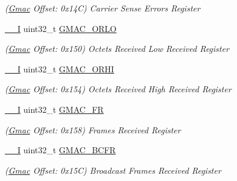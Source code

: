 \begin{DoxyCompactItemize}
\begin{DoxyCompactList}\small\item\em (\mbox{\hyperlink{structGmac}{Gmac}} Offset\+: 0x14C) Carrier Sense Errors Register \end{DoxyCompactList}\item 
\mbox{\label{structGmac_afd5fe5afb43e498fd3f786a0a14113e2}} 
\mbox{\hyperlink{core__cm7_8h_af63697ed9952cc71e1225efe205f6cd3}{\+\_\+\+\_\+I}} uint32\+\_\+t \mbox{\hyperlink{structGmac_afd5fe5afb43e498fd3f786a0a14113e2}{G\+M\+A\+C\+\_\+\+O\+R\+LO}}
\begin{DoxyCompactList}\small\item\em (\mbox{\hyperlink{structGmac}{Gmac}} Offset\+: 0x150) Octets Received Low Received Register \end{DoxyCompactList}\item 
\mbox{\label{structGmac_a08a4c2653767af8ee929df090c71bbb5}} 
\mbox{\hyperlink{core__cm7_8h_af63697ed9952cc71e1225efe205f6cd3}{\+\_\+\+\_\+I}} uint32\+\_\+t \mbox{\hyperlink{structGmac_a08a4c2653767af8ee929df090c71bbb5}{G\+M\+A\+C\+\_\+\+O\+R\+HI}}
\begin{DoxyCompactList}\small\item\em (\mbox{\hyperlink{structGmac}{Gmac}} Offset\+: 0x154) Octets Received High Received Register \end{DoxyCompactList}\item 
\mbox{\label{structGmac_a7e1afc6f3d12968360547b9cb97cc0e3}} 
\mbox{\hyperlink{core__cm7_8h_af63697ed9952cc71e1225efe205f6cd3}{\+\_\+\+\_\+I}} uint32\+\_\+t \mbox{\hyperlink{structGmac_a7e1afc6f3d12968360547b9cb97cc0e3}{G\+M\+A\+C\+\_\+\+FR}}
\begin{DoxyCompactList}\small\item\em (\mbox{\hyperlink{structGmac}{Gmac}} Offset\+: 0x158) Frames Received Register \end{DoxyCompactList}\item 
\mbox{\label{structGmac_a263fdaf6e2737534f9683f709212b9ba}} 
\mbox{\hyperlink{core__cm7_8h_af63697ed9952cc71e1225efe205f6cd3}{\+\_\+\+\_\+I}} uint32\+\_\+t \mbox{\hyperlink{structGmac_a263fdaf6e2737534f9683f709212b9ba}{G\+M\+A\+C\+\_\+\+B\+C\+FR}}
\begin{DoxyCompactList}\small\item\em (\mbox{\hyperlink{structGmac}{Gmac}} Offset\+: 0x15C) Broadcast Frames Received Register \end{DoxyCompactList}\item 

\end{DoxyCompactItemize}
